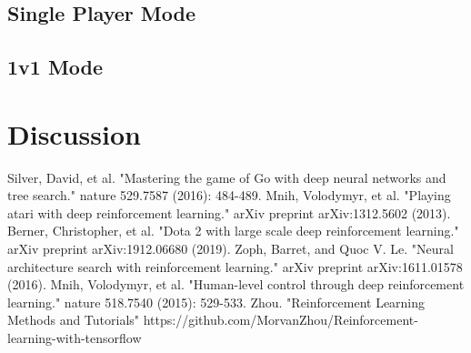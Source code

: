 \documentclass[12pt]{article}
\begin{document}
\subsection{Single Player Mode}

\subsection{1v1 Mode}



\section{Discussion}




\begin{thebibliography}{99}
	Silver, David, et al. "Mastering the game of Go with deep neural networks and tree search." nature 529.7587 (2016): 484-489.
	Mnih, Volodymyr, et al. "Playing atari with deep reinforcement learning." arXiv preprint arXiv:1312.5602 (2013).
	Berner, Christopher, et al. "Dota 2 with large scale deep reinforcement learning." arXiv preprint arXiv:1912.06680 (2019).
    Zoph, Barret, and Quoc V. Le. "Neural architecture search with reinforcement learning." arXiv preprint arXiv:1611.01578 (2016).
    Mnih, Volodymyr, et al. "Human-level control through deep reinforcement learning." nature 518.7540 (2015): 529-533.
    Zhou. "Reinforcement Learning Methods and Tutorials" https://github.com/MorvanZhou/Reinforcement-learning-with-tensorflow
\end{thebibliography}
\end{document}
